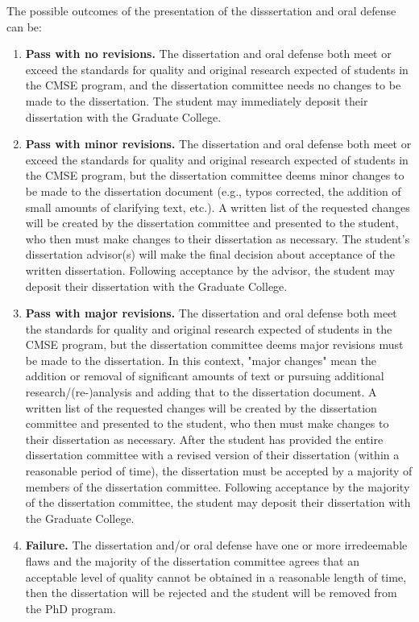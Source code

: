 The possible outcomes of the presentation of the disssertation and oral defense can be:

\begin{enumerate}

\item \textbf{Pass with no revisions.}  The dissertation and oral
  defense both meet or exceed the standards for quality and original
  research expected of students in the CMSE program, and the dissertation
  committee needs no changes to be made to the dissertation.  The
  student may immediately deposit their dissertation with the Graduate
  College.

\item  \textbf{Pass with minor revisions.}  The dissertation and oral
  defense both meet or exceed the standards  for quality and original
  research expected of students in the CMSE program, but the dissertation
  committee deems minor changes to be made to the dissertation
  document (e.g., typos corrected, the addition of small amounts of
  clarifying text, etc.).  A written list of the requested changes
  will be created by the dissertation committee and presented to the
  student, who then must make changes to their dissertation as
  necessary.  The student's dissertation advisor(s) will make the
  final decision about acceptance of the written dissertation.
  Following acceptance by the advisor, the student may deposit their
  dissertation with the Graduate College.

\item  \textbf{Pass with major revisions.}  The dissertation and oral
  defense both meet the standards for quality and original research
  expected of students in the CMSE program, but the dissertation committee
  deems major revisions must be made to the dissertation.  In this
  context, "major changes" mean the addition or removal of significant
  amounts of text or pursuing additional research/(re-)analysis and
  adding that to the dissertation document.  A written list of the
  requested changes will be created by the dissertation committee and
  presented to the student, who then must make changes to their
  dissertation as necessary.  After the student has provided the
  entire dissertation committee with a revised version of their dissertation
  (within a reasonable period of time), the dissertation must be accepted by
  a majority of members of the dissertation committee.  Following acceptance
  by the majority of the dissertation committee, the student may deposit
  their dissertation with the Graduate College.

\item  \textbf{Failure.} The dissertation and/or oral defense have one
  or more irredeemable flaws and the majority of the dissertation committee
  agrees that an acceptable level of quality cannot be obtained in a
  reasonable length of time, then the dissertation will be rejected
  and the student will be removed from the PhD program.


\end{enumerate}

